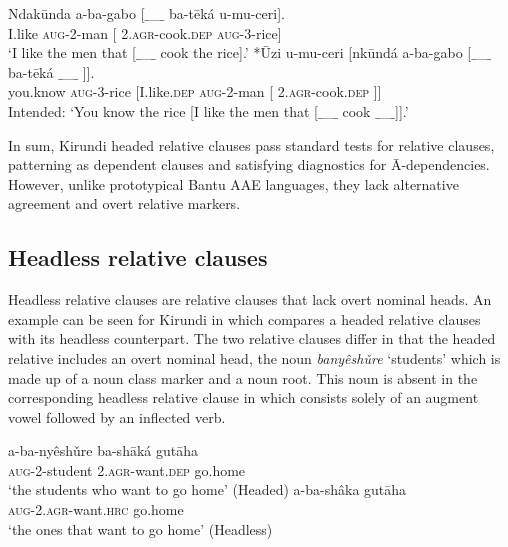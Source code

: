 \documentclass[output=paper,colorlinks,citecolor=brown
]{langscibook}
\begin{document}
\ea \label{ex:myers:objis}
\begin{xlist}
\ex \gll {}Ndakūnda a-ba-gabo [{$\_$\_$\_$} ba-tēká u-mu-ceri].\\
I.like  \textsc{aug}-2-man [{} 2.\textsc{agr}-cook\textsc{.dep} \textsc{aug}-3-rice]\\
\glt {}`I like the men that [{$\_$\_$\_$} cook the rice].'
\ex \gll {}*Ūzi u-mu-ceri [nkūndá a-ba-gabo [{$\_$\_$\_$} ba-tēká {$\_$\_$\_$} ]].\\
you.know \textsc{aug}-3-rice [I.like.\textsc{dep}  \textsc{aug}-2-man [{}  2.\textsc{agr}-cook\textsc{.dep} {} ]]\\
\glt {}Intended: `You know the rice [I like the men that [{$\_$\_$\_$} cook {$\_$\_$\_$}]].'

\end{xlist}
\z


In sum, Kirundi headed relative clauses pass standard tests for relative clauses, patterning as dependent clauses and satisfying diagnostics for Ā-dependencies. However, unlike prototypical Bantu AAE languages, they lack alternative agreement and overt relative markers.


\subsection{Headless relative clauses} \label{sec:myers:headless}

Headless relative clauses are relative clauses that lack overt nominal heads. An example can be seen for Kirundi in  which compares a headed relative clauses with its headless counterpart. The two relative clauses differ in that the headed relative  includes an overt nominal head, the noun \emph{banyêshǔre} `students' which is made up of a noun class marker and a noun root. This noun is absent in the corresponding headless relative clause in  which consists solely of an augment vowel followed by an inflected verb.

\ea  \label{ex:myers:red}
\begin{xlist}

\ex \label{ex:myers:red1} \gll  a-ba-nyêshǔre ba-shāká gutāha \\
\textsc{aug}-2-student \textsc{2.agr}-want.\textsc{dep} go.home\\
\glt `the students who want to go home' \hfill{(Headed)}
\ex \label{ex:myers:red2} \gll a-ba-shâka gutāha \\
\textsc{aug}-2.\textsc{agr}-want.\textsc{hrc} go.home \\
\glt `the ones that want to go home' \hfill{(Headless)}
\end{xlist}
\z
\end{document}
